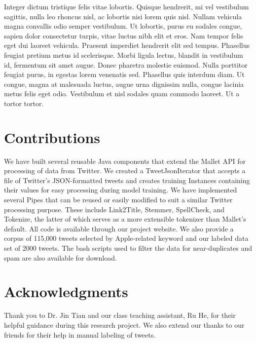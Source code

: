 \documentclass[letterpaper]{article}
\begin{document}
Integer dictum tristique felis vitae lobortis. Quisque hendrerit, mi vel vestibulum sagittis, nulla leo rhoncus nisl, ac lobortis nisi lorem quis nisl. Nullam vehicula magna convallis odio semper vestibulum. Ut lobortis, purus eu sodales congue, sapien dolor consectetur turpis, vitae luctus nibh elit et eros. Nam tempor felis eget dui laoreet vehicula. Praesent imperdiet hendrerit elit sed tempus. Phasellus feugiat pretium metus id scelerisque. Morbi ligula lectus, blandit in vestibulum id, fermentum sit amet augue. Donec pharetra molestie euismod. Nulla porttitor feugiat purus, in egestas lorem venenatis sed. Phasellus quis interdum diam. Ut congue, magna at malesuada luctus, augue urna dignissim nulla, congue lacinia metus felis eget odio. Vestibulum et nisl sodales quam commodo laoreet. Ut a tortor tortor.


\section{Contributions}
We have built several reusable Java components that extend the Mallet API for processing of data from Twitter. We created a TweetJsonIterator that accepts a file of Twitter's JSON-formatted tweets and creates training Instances containing their values for easy processing during model training. We have implemented several Pipes that can be reused or easily modified to suit a similar Twitter processing purpose. These include Link2Title, Stemmer, SpellCheck, and Tokenize, the latter of which serves as a more extensible tokenizer than Mallet's default. All code is available through our project website. We also provide a corpus of 115,000 tweets selected by Apple-related keyword and our labeled data set of 2000 tweets. The bash scripts used to filter the data for near-duplicates and spam are also available for download.

\section{ Acknowledgments}
Thank you to Dr. Jin Tian and our class teaching assistant, Ru He, for their helpful guidance during this research project. We also extend our thanks to our friends for their help in manual labeling of tweets.





\end{document}
